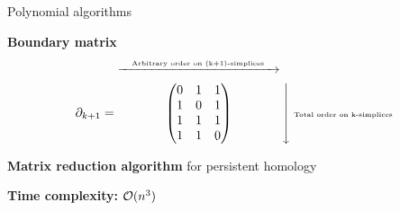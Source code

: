 \begin{frame}{Polynomial algorithms}
	\small
	
	\textbf{Boundary matrix}
	\[
		\partial_{k+1} = \arrowbounded{\begin{pmatrix}
				0 & 1 & 1 \\
				1 & 0 & 1 \\
				1 & 1 & 1 \\
				1 & 1 & 0 \\
		\end{pmatrix}
		}{Arbitrary order on (k+1)-simplices} \text{\tiny Total order on k-simplices}
	\]
	
	\vspace{0.2cm}
	
	\textbf{Matrix reduction algorithm} for persistent homology \cite{edelsbrunner_ComputationalTopologyIntroduction_2010}
	
	\textbf{Time complexity:} $\mathcal{O}(n^3)$ 
\end{frame}

